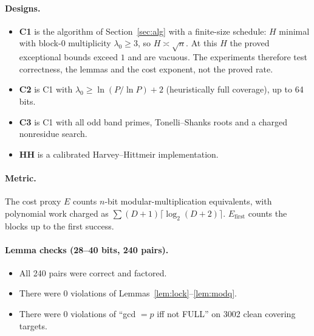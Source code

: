 \documentclass[11pt]{amsart}
\theoremstyle{definition}
\begin{document}
\paragraph{Designs.}
\begin{itemize}
\item \textbf{C1} is the algorithm of Section~\ref{sec:alg} with a finite-size schedule: $H$
  minimal with block-0 multiplicity $\lambda_0\ge3$, so $H\asymp\sqrt n$. At this $H$ the
  proved exceptional bounds exceed $1$ and are vacuous. The experiments therefore test
  correctness, the lemmas and the cost exponent, not the proved rate.
\item \textbf{C2} is C1 with $\lambda_0\ge\ln(P/\ln P)+2$ (heuristically full coverage), up to
  64 bits.
\item \textbf{C3} is C1 with all odd band primes, Tonelli--Shanks roots and a charged
  nonresidue search.
\item \textbf{HH} is a calibrated Harvey--Hittmeir implementation.
\end{itemize}

\paragraph{Metric.} The cost proxy $E$ counts $n$-bit modular-multiplication equivalents, with
polynomial work charged as $\sum(D+1)\lceil\log_2(D+2)\rceil$. $E_{\mathrm{first}}$ counts the
blocks up to the first success.

\paragraph{Lemma checks (28--40 bits, 240 pairs).}
\begin{itemize}
\item All 240 pairs were correct and factored.
\item There were 0 violations of Lemmas~\ref{lem:lock}--\ref{lem:modq}.
\item There were 0 violations of ``gcd $=p$ iff not FULL'' on 3002 clean covering targets.
\end{itemize}
\end{document}
